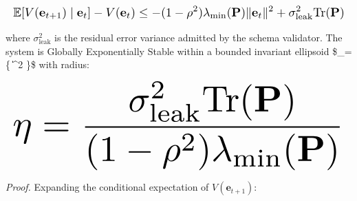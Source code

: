 \documentclass[10pt,twocolumn,letterpaper]{article}
\begin{document}
\begin{equation}
\resizebox{\columnwidth}{!}{$\displaystyle
\begin{aligned}
\mathbb{E}[V(\mathbf{e}_{t+1}) \mid \mathbf{e}_t] - V(\mathbf{e}_t) \le -(1 - \rho^2) \lambda_{\min}(\mathbf{P}) \|\mathbf{e}_t\|^2 + \sigma_{\text{leak}}^2 \text{Tr}(\mathbf{P})
\end{aligned}
$}
\end{equation}

















where $\sigma_{\text{leak}}^2$ is the residual error variance admitted by the schema validator. The system is Globally Exponentially Stable within a bounded invariant ellipsoid \$\_\eta = \{ \mid \|\|^2 \le \eta\}\$ with radius:

















\begin{equation}
\resizebox{\columnwidth}{!}{$\displaystyle
\begin{aligned}
\eta = \frac{\sigma_{\text{leak}}^2 \text{Tr}(\mathbf{P})}{(1 - \rho^2) \lambda_{\min}(\mathbf{P})}
\end{aligned}
$}
\end{equation}

















\textit{Proof.} Expanding the conditional expectation of $V(\mathbf{e}_{t+1})$:
\end{document}
